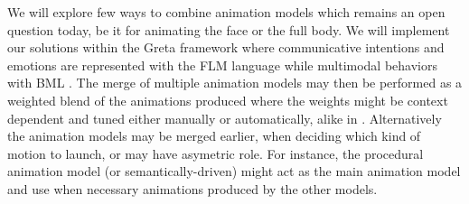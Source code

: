 We will explore few ways to combine animation models which remains an open question today, be it for animating the face or the full body. We will implement our solutions within the Greta framework where communicative intentions and emotions are represented with the FLM language while multimodal behaviors with BML \cite{DBLP:conf/iva/VilhjalmssonCCCKKMMMPRTWW07}. The merge of multiple animation models may then be performed as a weighted blend of the animations produced where the weights might be context dependent and tuned either manually or automatically, alike in \cite{DBLP:journals/tvcg/ShoulsonMKB14}. Alternatively the animation models may be merged earlier, when deciding which kind of motion to launch, or may have asymetric role. For instance, the procedural animation model (or semantically-driven) might act as the main animation model and use when necessary animations produced by the other models.




% 
% 

